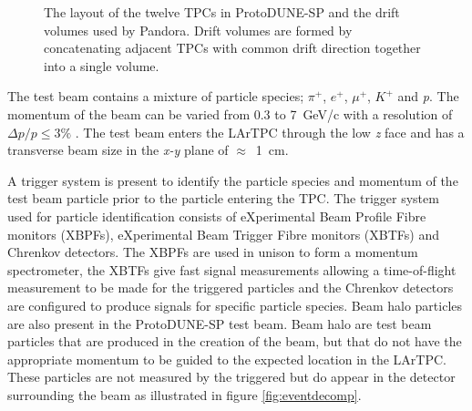 \begin{figure}
\centering
{}
\caption{The layout of \protect{} the twelve TPCs in ProtoDUNE-SP and \protect{} the drift volumes used by Pandora.  Drift volumes are formed by concatenating adjacent TPCs with common drift direction together into a single volume.}
\label{fig:tpcs}
\end{figure}

The test beam contains a mixture of particle species; $\pi^{+}$, $e^{+}$, $\mu^{+}$, $K^{+}$ and \textit{p}.  The momentum of the beam can be varied from 0.3 to 7~GeV/c with a resolution of $\Delta p/p \leq 3\%$ \cite{pdtdr}.  The test beam enters the LArTPC through the low \textit{z} face and has a transverse beam size in the \textit{x-y} plane of $\approx$~1~cm.

A trigger system is present to identify the particle species and momentum of the test beam particle prior to the particle entering the TPC.  The trigger system used for particle identification consists of eXperimental Beam Profile Fibre monitors (XBPFs), eXperimental Beam Trigger Fibre monitors (XBTFs) and Chrenkov detectors.  The XBPFs are used in unison to form a momentum spectrometer, the XBTFs give fast signal measurements allowing a time-of-flight measurement to be made for the triggered particles and the Chrenkov detectors are configured to produce signals for specific particle species.  Beam halo particles are also present in the ProtoDUNE-SP test beam.  Beam halo are test beam particles that are produced in the creation of the beam, but that do not have the appropriate momentum to be guided to the expected location in the LArTPC.  These particles are not measured by the triggered but do appear in the detector surrounding the beam as illustrated in figure \ref{fig:eventdecomp}.

